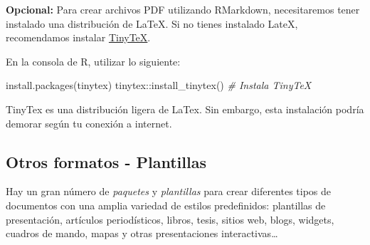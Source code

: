 \documentclass[
]{article}
\newenvironment{Shaded}{\begin{snugshade}}{\end{snugshade}}
\newcommand{\CommentTok}[1]{\textcolor[rgb]{0.56,0.35,0.01}{\textit{#1}}}
\newcommand{\FunctionTok}[1]{\textcolor[rgb]{0.00,0.00,0.00}{#1}}
\newcommand{\NormalTok}[1]{#1}
\newcommand{\SpecialCharTok}[1]{\textcolor[rgb]{0.00,0.00,0.00}{#1}}
\newcommand{\StringTok}[1]{\textcolor[rgb]{0.31,0.60,0.02}{#1}}
\begin{document}
\textbf{Opcional:} Para crear archivos PDF utilizando RMarkdown,
necesitaremos tener instalado una distribución de LaTeX. Si no tienes
instalado LateX, recomendamos instalar
\href{https://yihui.org/tinytex/}{TinyTeX}.

En la consola de R, utilizar lo siguiente:

\begin{Shaded}
\begin{Highlighting}[]
\FunctionTok{install.packages}\NormalTok{(}\StringTok{\textquotesingle{}tinytex\textquotesingle{}}\NormalTok{)}
\NormalTok{tinytex}\SpecialCharTok{::}\FunctionTok{install\_tinytex}\NormalTok{()  }\CommentTok{\# Instala TinyTeX}
\end{Highlighting}
\end{Shaded}

TinyTex es una distribución ligera de LaTex. Sin embargo, esta
instalación podría demorar según tu conexión a internet.

\hypertarget{otros-formatos---plantillas}{%
\subsection{Otros formatos -
Plantillas}\label{otros-formatos---plantillas}}

Hay un gran número de \emph{paquetes} y \emph{plantillas} para crear
diferentes tipos de documentos con una amplia variedad de estilos
predefinidos: plantillas de presentación, artículos periodísticos,
libros, tesis, sitios web, blogs, widgets, cuadros de mando, mapas y
otras presentaciones interactivas\ldots{}
\end{document}
